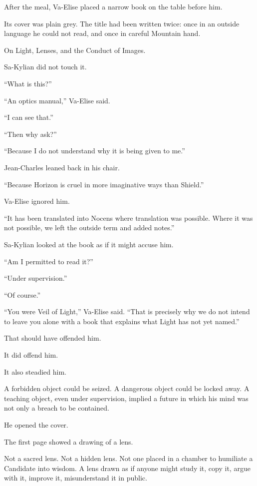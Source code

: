 After the meal, Va-Elise placed a narrow book on the table before him.\par
Its cover was plain grey. The title had been written twice: once in an outside language he could not read, and once in careful Mountain hand.\par
On Light, Lenses, and the Conduct of Images.\par
Sa-Kylian did not touch it.\par
“What is this?”\par
“An optics manual,” Va-Elise said.\par
“I can see that.”\par
“Then why ask?”\par
“Because I do not understand why it is being given to me.”\par
Jean-Charles leaned back in his chair.\par
“Because Horizon is cruel in more imaginative ways than Shield.”\par
Va-Elise ignored him.\par
“It has been translated into Nocens where translation was possible. Where it was not possible, we left the outside term and added notes.”\par
Sa-Kylian looked at the book as if it might accuse him.\par
“Am I permitted to read it?”\par
“Under supervision.”\par
“Of course.”\par
“You were Veil of Light,” Va-Elise said. “That is precisely why we do not intend to leave you alone with a book that explains what Light has not yet named.”\par
That should have offended him.\par
It did offend him.\par
It also steadied him.\par
A forbidden object could be seized. A dangerous object could be locked away. A teaching object, even under supervision, implied a future in which his mind was not only a breach to be contained.\par
He opened the cover.\par
The first page showed a drawing of a lens.\par
Not a sacred lens. Not a hidden lens. Not one placed in a chamber to humiliate a Candidate into wisdom. A lens drawn as if anyone might study it, copy it, argue with it, improve it, misunderstand it in public.\par
